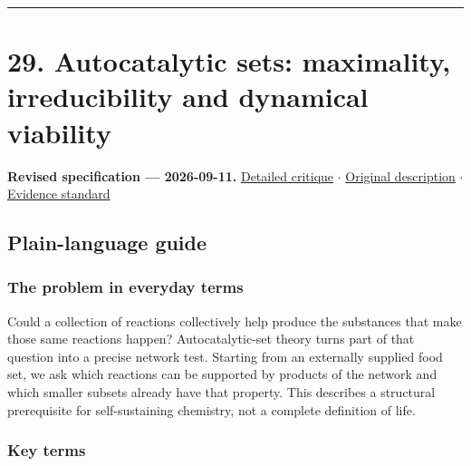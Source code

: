 \documentclass[
  11pt,
]{article}
\begin{document}
\begin{center}\rule{0.5\linewidth}{0.5pt}\end{center}

\section{29. Autocatalytic sets: maximality, irreducibility and
dynamical viability}

\textbf{Revised specification --- 2026-09-11.}
\href{https://github.com/rick-stevens-ai/Pure-Thought/blob/main/reviews/29-Chemical-Reaction-Networks-Origins.md}{Detailed
critique} \ensuremath{\cdot}
\href{https://github.com/rick-stevens-ai/Pure-Thought/blob/main/archive/original-PRDs/29-Chemical-Reaction-Networks-Origins.md}{Original
description} \ensuremath{\cdot}
\href{https://github.com/rick-stevens-ai/Pure-Thought/blob/main/reviews/EVIDENCE-STANDARD.md}{Evidence
standard}

\subsection{Plain-language guide}

\subsubsection{The problem in everyday terms}

Could a collection of reactions collectively help produce the substances
that make those same reactions happen? Autocatalytic-set theory turns
part of that question into a precise network test. Starting from an
externally supplied food set, we ask which reactions can be supported by
products of the network and which smaller subsets already have that
property. This describes a structural prerequisite for self-sustaining
chemistry, not a complete definition of life.

\subsubsection{Key terms}
\end{document}
